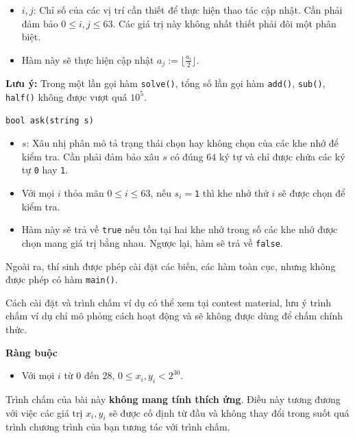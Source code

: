 \begin{itemize}
   \item $i,j$: Chỉ số của các vị trí cần thiết để thực hiện thao tác cập nhật. Cần phải đảm bảo $0\le i,j\le 63$. Các giá trị này không nhất thiết phải đôi một phân biệt.
   \item Hàm này sẽ thực hiện cập nhật $a_j:=\lfloor \frac{a_i}2 \rfloor$.
\end{itemize}

\textbf{Lưu ý:} Trong một lần gọi hàm \texttt{solve()}, tổng số lần gọi hàm \texttt{add()}, \texttt{sub()}, \texttt{half()} không được vượt quá $10^5$.

\begin{lstlisting}
bool ask(string s)
\end{lstlisting}

\begin{itemize}
   \item $s$: Xâu nhị phân mô tả trạng thái chọn hay không chọn của các khe nhớ để kiểm tra. Cần phải đảm bảo xâu $s$ có đúng $64$ ký tự và chỉ được chứa các ký tự \texttt{0} hay \texttt{1}.
   \item Với mọi $i$ thỏa mãn $0\le i\le 63$, nếu $s_i=$\texttt{1} thì khe nhớ thứ $i$ sẽ được chọn để kiểm tra.
   \item Hàm này sẽ trả về \texttt{true} nếu tồn tại hai khe nhớ trong số các khe nhớ được chọn mang giá trị bằng nhau. Ngược lại, hàm sẽ trả về \texttt{false}.
\end{itemize}

Ngoài ra, thí sinh được phép cài đặt các biến, các hàm toàn cục, nhưng không được phép có hàm \texttt{main()}.

Cách cài đặt và trình chấm ví dụ có thể xem tại contest material, lưu ý trình chấm ví dụ chỉ mô phỏng cách hoạt động và sẽ không được dùng để chấm chính thức.

\textbf{Ràng buộc}

\begin{itemize}
   \item Với mọi $i$ từ $0$ đến $28$, $0\le x_i,y_i<2^{30}$.
\end{itemize}

Trình chấm của bài này \textbf{không mang tính thích ứng}. Điều này tương đương với việc các giá trị $x_i,y_i$ sẽ được cố định từ đầu và không thay đổi trong suốt quá trình chương trình của bạn tương tác với trình chấm.